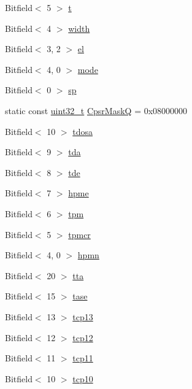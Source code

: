 \begin{DoxyCompactItemize}
\item 
Bitfield$<$ 5 $>$ \hyperlink{namespaceArmISA_af5dfd7e551f8c5b461816e813dab252f}{t}
\item 
Bitfield$<$ 4 $>$ \hyperlink{namespaceArmISA_a0da89c280130b84ae26405a901396428}{width}
\item 
Bitfield$<$ 3, 2 $>$ \hyperlink{namespaceArmISA_a88b4b47e4e77eea4a56009ee93e31855}{el}
\item 
Bitfield$<$ 4, 0 $>$ \hyperlink{namespaceArmISA_a5f3b9b97eb2dfa29d33e74878455f90d}{mode}
\item 
Bitfield$<$ 0 $>$ \hyperlink{namespaceArmISA_abec75b7aaa6ffc77683fc30a8b8abdba}{sp}
\item 
static const \hyperlink{Type_8hh_a435d1572bf3f880d55459d9805097f62}{uint32\_\-t} \hyperlink{namespaceArmISA_af300895ca4992a04304de3e5c727a32b}{CpsrMaskQ} = 0x08000000
\item 
Bitfield$<$ 10 $>$ \hyperlink{namespaceArmISA_a94d513fc3b4ec2aa4a97d6794192382c}{tdosa}
\item 
Bitfield$<$ 9 $>$ \hyperlink{namespaceArmISA_a98489d07a1e014ef5e854cd3dd102cc6}{tda}
\item 
Bitfield$<$ 8 $>$ \hyperlink{namespaceArmISA_a87f87f14bd02ec29539a4363eb3bc121}{tde}
\item 
Bitfield$<$ 7 $>$ \hyperlink{namespaceArmISA_a90cc2a4021b9c8344c65c7a9372fb4d8}{hpme}
\item 
Bitfield$<$ 6 $>$ \hyperlink{namespaceArmISA_a2cf1587413ec005bb67d49880287a4ac}{tpm}
\item 
Bitfield$<$ 5 $>$ \hyperlink{namespaceArmISA_aeda4e32fc8dc4e6140c70d5f4b09faf4}{tpmcr}
\item 
Bitfield$<$ 4, 0 $>$ \hyperlink{namespaceArmISA_ae14337c21c2260c68afe4f93cdbc8c49}{hpmn}
\item 
Bitfield$<$ 20 $>$ \hyperlink{namespaceArmISA_a508e47bad0573bd968d3f363aac7982d}{tta}
\item 
Bitfield$<$ 15 $>$ \hyperlink{namespaceArmISA_a5036f352badf3e2580eda4219cd4049c}{tase}
\item 
Bitfield$<$ 13 $>$ \hyperlink{namespaceArmISA_ad11109a1b35e3fc54985b6e07880fbad}{tcp13}
\item 
Bitfield$<$ 12 $>$ \hyperlink{namespaceArmISA_a7772929ee973419a46aa5dbfde3afa7c}{tcp12}
\item 
Bitfield$<$ 11 $>$ \hyperlink{namespaceArmISA_aeb12d03098c6198adb389af7bcf26d7f}{tcp11}
\item 
Bitfield$<$ 10 $>$ \hyperlink{namespaceArmISA_a6b1e8414f8803e11f6c0bafb4132dde9}{tcp10}

\end{DoxyCompactItemize}
